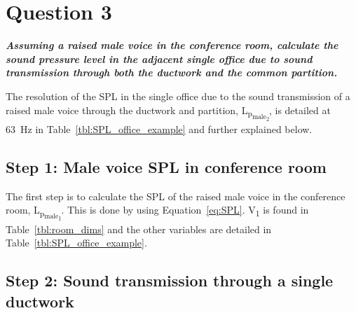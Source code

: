 \section{Question 3}

\textbf{\textit{Assuming a raised male voice in the conference room, calculate the sound pressure level in the adjacent single office due to sound transmission through both the ductwork and the common partition.}}


The resolution of the SPL in the single office due to the sound transmission of a raised male voice through the ductwork and partition, L\textsubscript{p\textsubscript{male\textsubscript{2}}}, is detailed at 63~Hz in Table~\ref{tbl:SPL_office_example} and further explained below.



\subsection{Step 1: Male voice SPL in conference room}

The first step is to calculate the SPL of the raised male voice in the conference room, L\textsubscript{p\textsubscript{male\textsubscript{1}}}.
This is done by using Equation~\ref{eq:SPL}.
V\textsubscript{1} is found in Table~\ref{tbl:room_dims} and the other variables are detailed in Table~\ref{tbl:SPL_office_example}.



\subsection{Step 2: Sound transmission through a single ductwork}

